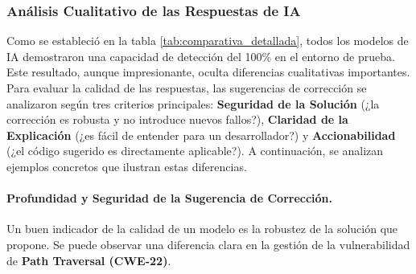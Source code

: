 \subsubsection{Análisis Cualitativo de las Respuestas de IA}

Como se estableció en la tabla \ref{tab:comparativa_detallada}, todos los modelos de IA demostraron una capacidad de detección del 100\% en el entorno de prueba. Este resultado, aunque impresionante, oculta diferencias cualitativas importantes. Para evaluar la calidad de las respuestas, las sugerencias de corrección se analizaron según tres criterios principales: \textbf{Seguridad de la Solución} (¿la corrección es robusta y no introduce nuevos fallos?), \textbf{Claridad de la Explicación} (¿es fácil de entender para un desarrollador?) y \textbf{Accionabilidad} (¿el código sugerido es directamente aplicable?). A continuación, se analizan ejemplos concretos que ilustran estas diferencias.

\paragraph{Profundidad y Seguridad de la Sugerencia de Corrección.}
Un buen indicador de la calidad de un modelo es la robustez de la solución que propone. Se puede observar una diferencia clara en la gestión de la vulnerabilidad de \textbf{Path Traversal (CWE-22)}.


